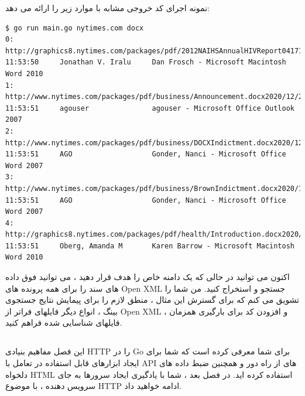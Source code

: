 \documentclass[12pt]{book}
\begin{document}
{نمونه اجرای کد خروجی مشابه با موارد زیر را ارائه می دهد:
\begin{latin}
	\begin{lstlisting}
$ go run main.go nytimes.com docx
0: http://graphics8.nytimes.com/packages/pdf/2012NAIHSAnnualHIVReport041713.docx2020/12/21 11:53:50     Jonathan V. Iralu     Dan Frosch - Microsoft Macintosh Word 2010
1: http://www.nytimes.com/packages/pdf/business/Announcement.docx2020/12/21 11:53:51     agouser               agouser - Microsoft Office Outlook 2007
2: http://www.nytimes.com/packages/pdf/business/DOCXIndictment.docx2020/12/21 11:53:51     AGO                   Gonder, Nanci - Microsoft Office Word 2007
3: http://www.nytimes.com/packages/pdf/business/BrownIndictment.docx2020/12/21 11:53:51     AGO                   Gonder, Nanci - Microsoft Office Word 2007
4: http://graphics8.nytimes.com/packages/pdf/health/Introduction.docx2020/12/21 11:53:51     Oberg, Amanda M       Karen Barrow - Microsoft Macintosh Word 2010
	\end{lstlisting}
\end{latin}
اکنون می توانید در حالی که یک دامنه خاص را هدف قرار دهید ، می توانید فوق داده های سند را برای همه پرونده های Open XML جستجو و استخراج کنید. من شما را تشویق می کنم که برای گسترش این مثال ، منطق لازم را برای پیمایش نتایج جستجوی بینگ ، انواع دیگر فایلهای فراتر از Open XML ، و افزودن کد برای بارگیری همزمان فایلهای شناسایی شده فراهم کنید.
\section{}
این فصل مفاهیم بنیادی HTTP را در Go برای شما معرفی کرده است که شما برای ایجاد ابزارهای قابل استفاده در تعامل با API های از راه دور و همچنین ضبط داده های دلخواه HTML استفاده کرده اید. در فصل بعد ، شما با یادگیری ایجاد سرورها به جای سرویس دهنده ، با موضوع HTTP ادامه خواهید داد.
\chapter{}
\section{}
\section{}
\section{}
}
\end{document}
